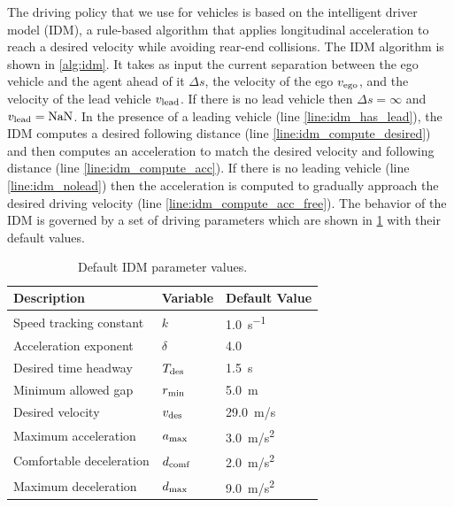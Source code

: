The driving policy that we use for vehicles is based on the intelligent driver model (IDM), a rule-based algorithm that applies longitudinal acceleration to reach a desired velocity while avoiding rear-end collisions. The IDM algorithm is shown in \cref{alg:idm}. It takes as input the current separation between the ego vehicle and the agent ahead of it $\Delta s$, the velocity of the ego $v_{\rm ego}$, and the velocity of the lead vehicle $v_{\rm lead}$. If there is no lead vehicle then $\Delta s = \infty$ and $v_{\rm lead} = {\rm NaN}$. In the presence of a leading vehicle (line \ref{line:idm_has_lead}), the IDM computes a desired following distance (line \ref{line:idm_compute_desired}) and then computes an acceleration to match the desired velocity and following distance (line \ref{line:idm_compute_acc}). If there is no leading vehicle (line \ref{line:idm_nolead}) then the acceleration is computed to gradually approach the desired driving velocity (line \ref{line:idm_compute_acc_free}). The behavior of the IDM is governed by a set of driving parameters which are shown in \cref{tab:idm_params} with their default values. 


\begin{table}
    \centering
    \caption{Default IDM parameter values.}
    \label{tab:idm_params}
    \begin{tabular}{@{}lll@{}} 
        \toprule
        \textbf{Description} & \textbf{Variable} & \textbf{Default Value} \\
        \midrule
        Speed tracking constant & $k$ & \SI{1.0}{s^{-1}} \\
        Acceleration exponent & $\delta$ & \num{4.0} \\
        Desired time headway & $T_{\rm des}$ & \SI{1.5}{s}\\
        Minimum allowed gap & $r_{\rm min}$ & \SI{5.0}{m} \\
        Desired velocity & $v_{\rm des}$ & \SI{29.0}{m/s} \\
        Maximum acceleration & $a_{\rm max}$ & \SI{3.0}{m/s^2} \\
        Comfortable deceleration & $d_{\rm comf}$ & \SI{2.0}{m/s^2} \\
        Maximum deceleration & $d_{\rm max}$ & \SI{9.0}{m/s^2} \\
        \bottomrule
    \end{tabular}
    \vskip -0.2in
\end{table}


